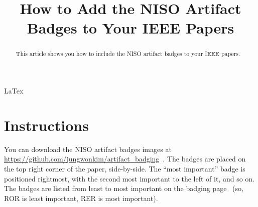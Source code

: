 \documentclass[conference]{IEEEtran}
\begin{document}
\title{How to Add the NISO Artifact Badges to Your IEEE Papers}

\author{
}

\maketitle

\BgThispage

\begin{abstract}
This article shows you how to include the NISO artifact badges to your IEEE papers.
\end{abstract}

\begin{IEEEkeywords}
LaTex
\end{IEEEkeywords}

\section{Instructions}
You can download the NISO artifact badges images at \url{https://github.com/jungwonkim/artifact\_badging}~\cite{GITHUB}. The badges are placed on the top right corner of the paper, side-by-side. The “most important” badge is positioned rightmost, with the second most important to the left of it, and so on. The badges are listed from least to most important on the badging page~\cite{NISO} (so, ROR is least important, RER is most important).



\end{document}
